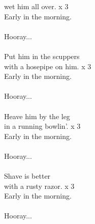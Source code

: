             wet him all over. x 3  \\
            Early in the morning. \\
\hspace{10mm} \\
            Hooray... \\
\hspace{10mm} \\
            Put him in the scuppers  \\
            with a hosepipe on him. x 3  \\
            Early in the morning. \\
\hspace{10mm} \\
            Hooray... \\
\hspace{10mm} \\
            Heave him by the leg \\
            in a running bowlin'. x 3  \\
            Early in the morning. \\
\hspace{10mm} \\
            Hooray... \\
\hspace{10mm} \\
            Shave is better  \\
            with a rusty razor. x 3  \\
            Early in the morning. \\
\hspace{10mm} \\
            Hooray... \\
